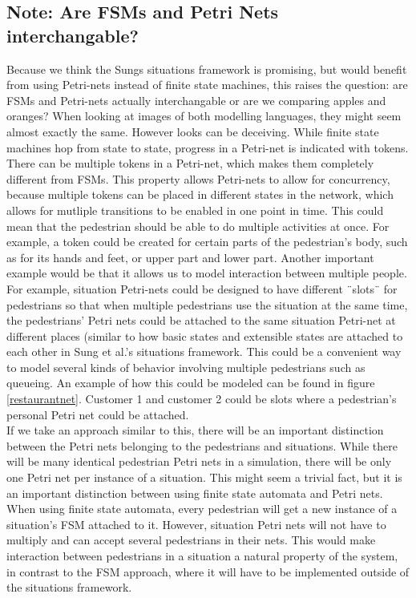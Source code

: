 \documentclass[11pt, a4paper]{book}
\begin{document}
\subsection{Note: Are FSMs and Petri Nets interchangable?}
Because we think the Sungs situations framework is promising, but would benefit from using Petri-nets instead of finite state machines, this raises the question: are FSMs and Petri-nets actually interchangable or are we comparing apples and oranges?
When looking at images of both modelling languages, they might seem almost exactly the same. However looks can be deceiving. While finite state machines hop from state to state, progress in a Petri-net is indicated with tokens. There can be multiple tokens in a Petri-net, which makes them completely different from FSMs. This property allows Petri-nets to allow for concurrency, because multiple tokens can be placed in different states in the network, which allows for mutliple transitions to be enabled in one point in time. This could mean that the pedestrian should be able to do multiple activities at once. For example, a token could be created for certain parts of the pedestrian's body, such as for its hands and feet, or upper part and lower part. Another important example would be that it allows us to model interaction between multiple people. For example, situation Petri-nets could be designed to have different ¨slots¨ for pedestrians so that when multiple pedestrians use the situation at the same time, the pedestrians' Petri nets could be attached to the same situation Petri-net at different places (similar to how basic states and extensible states are attached to each other in Sung et al.'s situations framework. This could be a convenient way to model several kinds of behavior involving multiple pedestrians such as queueing. An example of how this could be modeled can be found in figure \ref{restaurantnet}.
Customer 1 and customer 2 could be slots where a pedestrian's personal Petri net could be attached. \\
If we take an approach similar to this, there will be an important distinction between the Petri nets belonging to the pedestrians and situations. While there will be many identical pedestrian Petri nets in a simulation, there will be only one Petri net per instance of a situation. This might seem a trivial fact, but it is an important distinction between using finite state automata and Petri nets. When using finite state automata, every pedestrian will get a new instance of a situation's FSM attached to it. However, situation Petri nets will not have to multiply and can accept several pedestrians in their nets. This would make interaction between pedestrians in a situation a natural property of the system, in contrast to the FSM approach, where it will have to be implemented outside of the situations framework.
\end{document}
